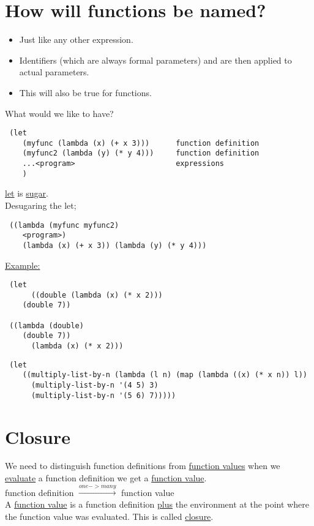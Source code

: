 \documentclass{article}
\begin{document}
\section{How will functions be named?}
\begin{flushleft}
\begin{itemize}
 \item Just like any other expression.
 \item Identifiers (which are always formal parameters) and are then applied to actual parameters.
 \item This will also be true for functions.
\end{itemize}
\bigskip
What would we like to have?\\
\begin{verbatim}
 (let
    (myfunc (lambda (x) (+ x 3)))      function definition
    (myfunc2 (lambda (y) (* y 4)))     function definition
    ...<program>                       expressions
    )
\end{verbatim}
\underline{let} is \underline{sugar}.\\
Desugaring the let;
\begin{verbatim}
 ((lambda (myfunc myfunc2)
    <program>)
    (lambda (x) (+ x 3)) (lambda (y) (* y 4)))
\end{verbatim}
\pagebreak
\underline{Example:}
\begin{verbatim}
 (let
      ((double (lambda (x) (* x 2)))
    (double 7))
 
 ((lambda (double)
    (double 7))
      (lambda (x) (* x 2)))
\end{verbatim}
\begin{verbatim}
 (let
    ((multiply-list-by-n (lambda (l n) (map (lambda ((x) (* x n)) l))
      (multiply-list-by-n '(4 5) 3)
      (multiply-list-by-n '(5 6) 7)))))
\end{verbatim}
\end{flushleft}

\section{Closure}
\begin{flushleft}
 We need to distinguish function definitions from \underline{function values} when we \underline{evaluate} a function definition we get a \underline{function value}.\\
 \bigskip
 function definition $\xrightarrow{one->many}$ function value\\
 \bigskip
 A \underline{function value} is a function definition \underline{plus} the environment at the point where the function value was evaluated. This is called \underline{closure}.
\end{flushleft}
\end{document}

